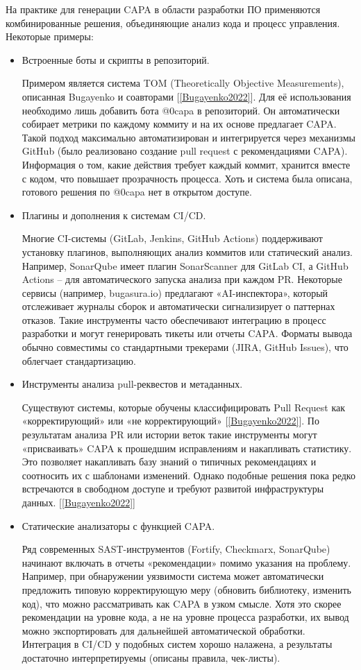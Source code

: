 На практике для генерации CAPA в области разработки ПО применяются комбинированные решения, объединяющие анализ кода и процесс управления. Некоторые примеры:

\begin{itemize}
	\item Встроенные боты и скрипты в репозиторий. 
	
	Примером является система TOM (Theoretically Objective Measurements), описанная Bugayenko  и соавторами [\ref{Bugayenko2022}]. Для её использования необходимо лишь добавить бота @0capa в репозиторий. Он автоматически собирает метрики по каждому коммиту и на их основе предлагает CAPA. Такой подход максимально автоматизирован и интегрируется через механизмы GitHub (было реализовано создание pull request с рекомендациями CAPA). Информация о том, какие действия требует каждый коммит, хранится вместе с кодом, что повышает прозрачность процесса. Хоть и система была описана, готового решения по @0capa нет в открытом доступе.
	
	\item Плагины и дополнения к системам CI/CD.
	
	Многие CI-системы (GitLab, Jenkins, GitHub Actions) поддерживают установку плагинов, выполняющих анализ коммитов или статический анализ. Например, SonarQube имеет плагин SonarScanner для GitLab CI, а GitHub Actions – для автоматического запуска анализа при каждом PR. Некоторые сервисы (например, bugasura.io) предлагают «AI-инспектора», который отслеживает журналы сборок и автоматически сигнализирует о паттернах отказов. Такие инструменты часто обеспечивают интеграцию в процесс разработки и могут генерировать тикеты или отчеты CAPA. Форматы вывода обычно совместимы со стандартными трекерами (JIRA, GitHub Issues), что облегчает стандартизацию.
	
	\item Инструменты анализа pull-реквестов и метаданных.
	
	Существуют системы, которые обучены классифицировать Pull Request как «корректирующий» или «не корректирующий» [\ref{Bugayenko2022}]. По результатам анализа PR или истории веток такие инструменты могут «присваивать» CAPA к прошедшим исправлениям и накапливать статистику.  Это позволяет накапливать базу знаний о типичных рекомендациях и соотносить их с шаблонами изменений. Однако подобные решения пока редко встречаются в свободном доступе и требуют развитой инфраструктуры данных. [\ref{Bugayenko2022}]
	\item Статические анализаторы с функцией CAPA. 
	
	 Ряд современных SAST-инструментов (Fortify, Checkmarx, SonarQube) начинают включать в отчеты «рекомендации» помимо указания на проблему. Например, при обнаружении уязвимости система может автоматически предложить типовую корректирующую меру (обновить библиотеку, изменить код), что можно рассматривать как CAPA в узком смысле. Хотя это скорее рекомендации на уровне кода, а не на уровне процесса разработки, их вывод можно экспортировать для дальнейшей автоматической обработки. Интеграция в CI/CD у подобных систем хорошо налажена, а результаты достаточно интерпретируемы (описаны правила, чек-листы).
\end{itemize}

